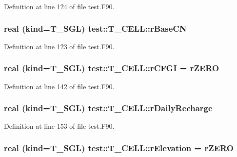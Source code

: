 Definition at line 124 of file test.F90.

\hypertarget{typetest_1_1_t___c_e_l_l_a54ef985a5ee67e2b5c6ad06749ab8d43}{
\subsubsection[{rBaseCN}]{\setlength{\rightskip}{0pt plus 5cm}real (kind={\bf T\_\-SGL}) {\bf test::T\_\-CELL::rBaseCN}}}
\label{typetest_1_1_t___c_e_l_l_a54ef985a5ee67e2b5c6ad06749ab8d43}


Definition at line 123 of file test.F90.

\hypertarget{typetest_1_1_t___c_e_l_l_ae75aac413c7f48930149ca3b03b5b428}{
\subsubsection[{rCFGI}]{\setlength{\rightskip}{0pt plus 5cm}real (kind={\bf T\_\-SGL}) {\bf test::T\_\-CELL::rCFGI} = {\bf rZERO}}}
\label{typetest_1_1_t___c_e_l_l_ae75aac413c7f48930149ca3b03b5b428}


Definition at line 142 of file test.F90.

\hypertarget{typetest_1_1_t___c_e_l_l_a190431a3d42a9211cd8ff5d48f7d9124}{
\subsubsection[{rDailyRecharge}]{\setlength{\rightskip}{0pt plus 5cm}real (kind={\bf T\_\-SGL}) {\bf test::T\_\-CELL::rDailyRecharge}}}
\label{typetest_1_1_t___c_e_l_l_a190431a3d42a9211cd8ff5d48f7d9124}


Definition at line 153 of file test.F90.

\hypertarget{typetest_1_1_t___c_e_l_l_aa101ba1a9b7cc92af49b61177137b4bc}{
\subsubsection[{rElevation}]{\setlength{\rightskip}{0pt plus 5cm}real (kind={\bf T\_\-SGL}) {\bf test::T\_\-CELL::rElevation} = {\bf rZERO}}}
\label{typetest_1_1_t___c_e_l_l_aa101ba1a9b7cc92af49b61177137b4bc}


